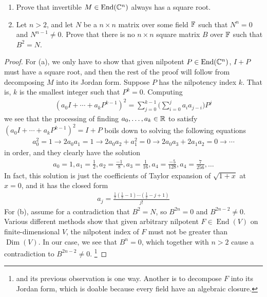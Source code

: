 \documentclass{report}
\begin{document}
\begin{question}{}{}
\begin{enumerate}[label=(\alph*)]
  \item Prove that invertible $M \in \operatorname{End}(\mathbb{C}^n)$ always has a square root. 
  \item  Let $n>2$, and let $N$ be a  $n\times n$ matrix over some field $\mathbb{F}$ such that $N^n=0$ and $N^{n-1}\neq 0$. Prove that there is no $n\times n$ square matrix $B$ over $\mathbb{F}$  such that $B^2=N$. 
\end{enumerate}
\end{question}
\begin{proof}
For (a), we only have to show that given nilpotent $P\in \operatorname{End}(\mathbb{C}^n)$, $I+P$ must have a square root, and then the rest of the proof will follow from decomposing $M$ into its Jordan form. Suppose $P$ has the nilpotency index $k$. That is, $k$ is the smallest integer such that $P^k=0$. Computing
\begin{align*}
  (a_0I+\cdots + a_k P^{k-1})^2= \sum_{j=0}^{k-1} \Big(\sum_{i=0}^j a_i a_{j-i}\Big)P^j 
\end{align*}
we see that the processing of finding $a_0,\dots ,a_k \in\mathbb{R}$ to satisfy $(a_0I+\cdots +a_kP^{k-1})^2=I+P$ boils down to solving the following equations  
\begin{align*}
a_0^2=1 \longrightarrow 2a_0a_1=1 \longrightarrow 2a_0a_2+a_1^2=0\longrightarrow 2a_0a_3+2a_1a_2=0 \longrightarrow \cdots 
\end{align*}
in order, and they clearly have the solution 
\begin{align*}
a_0=1,a_1= \frac{1}{2},a_2 = \frac{-1}{8}, a_3= \frac{1}{16} ,a_4= \frac{-5}{128}, a_4 = \frac{7}{256},\dots 
\end{align*}
In fact, this solution is just the coefficients of Taylor expansion of $\sqrt{1+x}$ at $x=0$, and it has the closed form 
 \begin{align*}
a_j= \frac{\frac{1}{2}(\frac{1}{2}-1)\cdots (\frac{1}{2}-j+1)}{j!}
\end{align*}
For (b), assume for a contradiction that $B^2=N$, so  $B^{2n}=0$ and $B^{2n-2}\neq 0$. Various different methods show that given arbitrary nilpotent $F \in \operatorname{End}(V)$ on finite-dimensional $V$, the nilpotent index of $F$ must not be greater than  $\operatorname{Dim}(V)$. In our case, we see that $B^n=0$, which together with $n>2$ cause a contradiction to  $B^{2n-2}\neq 0$.  \footnote{ and its previous observation is one way. Another is to decompose $F$ into its Jordan form, which is doable because every field have an algebraic closure.} 
\end{proof}
\end{document}
